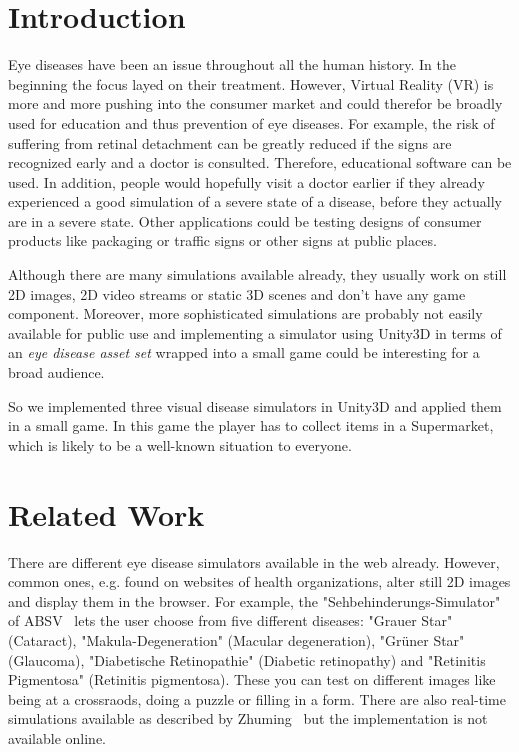 \documentclass{sig-alternate-05-2015}
\begin{document}
\section{Introduction}
Eye diseases have been an issue throughout all the human history.
In the beginning the focus layed on their treatment.
However, Virtual Reality (VR) is more and more pushing into the consumer market and could therefor be broadly used for education and thus prevention of eye diseases.
For example, the risk of suffering from retinal detachment can be greatly reduced if the signs are recognized early and a doctor is consulted.
Therefore, educational software can be used.
In addition, people would hopefully visit a doctor earlier if they already experienced a good simulation of a severe state of a disease, before they actually are in a severe state.
Other applications could be testing designs of consumer products like packaging or traffic signs or other signs at public places.

Although there are many simulations available already, they usually work on still 2D images, 2D video streams or static 3D scenes and don't have any game component.
Moreover, more sophisticated simulations are probably not easily available for public use and implementing a simulator using Unity3D in terms of an \emph{eye disease asset set} wrapped into a small game could be interesting for a broad audience.

So we implemented three visual disease simulators in Unity3D and applied them in a small game.
In this game the player has to collect items in a Supermarket, which is likely to be a well-known situation to everyone.

\section{Related Work}
There are different eye disease simulators available in the web already.
However, common ones, e.g. found on websites of health organizations, alter still 2D images and display them in the browser.
For example, the "Sehbehinderungs-Simulator" of ABSV~\cite{absv} lets the user choose from five different diseases: "Grauer Star" (Cataract), "Makula-Degeneration" (Macular degeneration), "Grüner Star" (Glaucoma), "Diabetische Retinopathie" (Diabetic retinopathy) and "Retinitis Pigmentosa" (Retinitis pigmentosa).
These you can test on different images like being at a crossraods, doing a puzzle or filling in a form. 
There are also real-time simulations available as described by Zhuming~\cite{eyediseasesim-zhuming} but the implementation is not available online.
\end{document}
